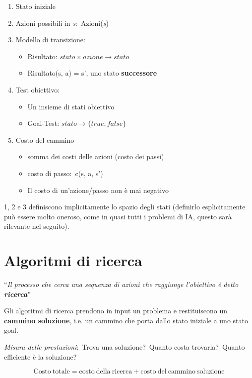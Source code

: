 \begin{enumerate}
	\item Stato iniziale
	\item Azioni possibili in \textit{s}:\ Azioni(\textit{s})
	\item Modello di transizione:
	      \begin{itemize}
		      \item Risultato: $stato \times azione \rightarrow stato$
		      \item Risultato(s, a) = s', uno stato \textbf{successore}
	      \end{itemize}
	\item Test obiettivo:
	      \begin{itemize}
		      \item Un insieme di stati obiettivo
		      \item Goal-Test: $stato \rightarrow \{true, false\}$
	      \end{itemize}
	\item Costo del cammino
	      \begin{itemize}
		      \item somma dei costi delle azioni (costo dei passi)
		      \item costo di passo:\ c(s, a, s')
		      \item Il costo di un'azione/passo non è mai negativo
	      \end{itemize}
\end{enumerate}
1, 2 e 3 definiscono implicitamente lo spazio degli stati (definirlo esplicitamente può essere molto oneroso, come in quasi tutti i problemi di IA, questo sarà rilevante nel seguito).

\section{Algoritmi di ricerca}
\begin{center}
	``\textit{Il processo che cerca una sequenza di azioni che raggiunge l'obiettivo è detto \textbf{ricerca}}''
\end{center}
Gli algoritmi di ricerca prendono in input un problema e restituiscono un \textbf{cammino soluzione}, i.e. un cammino che porta dallo stato iniziale a uno stato goal.

\textit{Misura delle prestazioni}:\ Trova una soluzione?\ Quanto costa trovarla?\
Quanto efficiente è la soluzione?

\[ \mathrm{Costo\ totale = costo\ della\ ricerca + costo\ del\ cammino\ soluzione}\]

